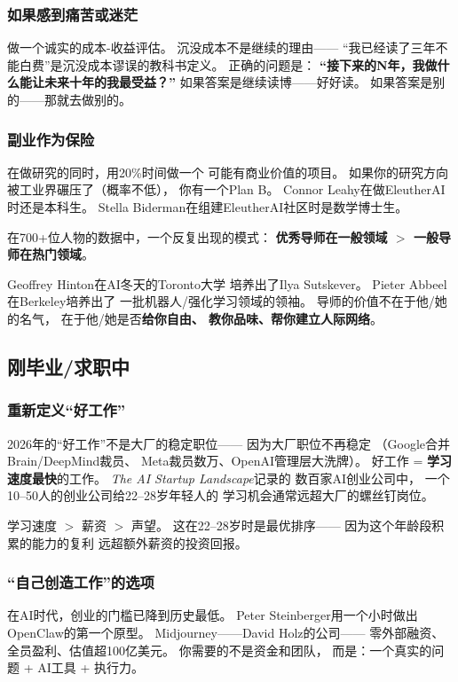 \subsubsection{如果感到痛苦或迷茫}
做一个诚实的成本-收益评估。
沉没成本不是继续的理由——
``我已经读了三年不能白费''是沉没成本谬误的教科书定义。
正确的问题是：
\textbf{``接下来的N年，我做什么能让未来十年的我最受益？''}
如果答案是继续读博——好好读。
如果答案是别的——那就去做别的。

\subsubsection{副业作为保险}
在做研究的同时，用20\%时间做一个
可能有商业价值的项目。
如果你的研究方向被工业界碾压了（概率不低），
你有一个Plan B。
Connor Leahy在做EleutherAI时还是本科生。
Stella Biderman在组建EleutherAI社区时是数学博士生。

\begin{corebox}[导师质量公式]
在700+位人物的数据中，一个反复出现的模式：
\textbf{优秀导师在一般领域 $>$ 一般导师在热门领域}。

Geoffrey Hinton在AI冬天的Toronto大学
培养出了Ilya Sutskever。
Pieter Abbeel在Berkeley培养出了
一批机器人/强化学习领域的领袖。
导师的价值不在于他/她的名气，
在于他/她是否\textbf{给你自由、
教你品味、帮你建立人际网络}。
\end{corebox}

\subsection{刚毕业/求职中}

\subsubsection{重新定义``好工作''}
2026年的``好工作''不是大厂的稳定职位——
因为大厂职位不再稳定
（Google合并Brain/DeepMind裁员、
Meta裁员数万、OpenAI管理层大洗牌）。
好工作 = \textbf{学习速度最快}的工作。
\textit{The AI Startup Landscape}记录的
数百家AI创业公司中，
一个10--50人的创业公司给22--28岁年轻人的
学习机会通常远超大厂的螺丝钉岗位。

学习速度 $>$ 薪资 $>$ 声望。
这在22--28岁时是最优排序——
因为这个年龄段积累的能力的复利
远超额外薪资的投资回报。

\subsubsection{``自己创造工作''的选项}
在AI时代，创业的门槛已降到历史最低。
Peter Steinberger用一个小时做出OpenClaw的第一个原型。
Midjourney——David Holz的公司——
零外部融资、全员盈利、估值超100亿美元。
你需要的不是资金和团队，
而是：一个真实的问题 + AI工具 + 执行力。

